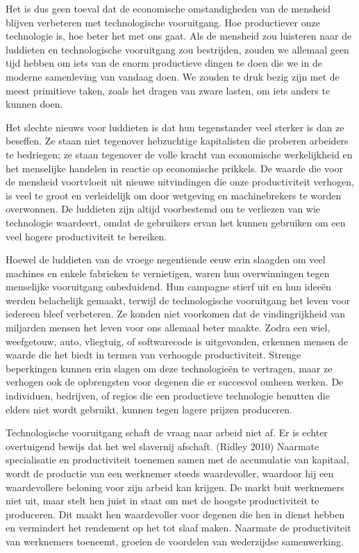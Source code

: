 \documentclass[
  a5paper,
  smalldemyvopaper,11pt,twoside,onecolumn,openright,extrafontsizes,
hidelinks]{memoir}
\begin{document}
Het is dus geen toeval dat de economische omstandigheden van de mensheid
blijven verbeteren met technologische vooruitgang. Hoe productiever onze
technologie is, hoe beter het met ons gaat. Als de mensheid zou
luisteren naar de luddieten en technologische vooruitgang zou
bestrijden, zouden we allemaal geen tijd hebben om iets van de enorm
productieve dingen te doen die we in de moderne samenleving van vandaag
doen. We zouden te druk bezig zijn met de meest primitieve taken, zoals
het dragen van zware lasten, om iets anders te kunnen doen.

Het slechte nieuws voor luddieten is dat hun tegenstander veel sterker
is dan ze beseffen. Ze staan niet tegenover hebzuchtige kapitalisten die
proberen arbeiders te bedriegen; ze staan tegenover de volle kracht van
economische werkelijkheid en het menselijke handelen in reactie op
economische prikkels. De waarde die voor de mensheid voortvloeit uit
nieuwe uitvindingen die onze productiviteit verhogen, is veel te groot
en verleidelijk om door wetgeving en machinebrekers te worden
overwonnen. De luddieten zijn altijd voorbestemd om te verliezen van wie
technologie waardeert, omdat de gebruikers ervan het kunnen gebruiken om
een veel hogere productiviteit te bereiken.

Hoewel de luddieten van de vroege negentiende eeuw erin slaagden om veel
machines en enkele fabrieken te vernietigen, waren hun overwinningen
tegen menselijke vooruitgang onbeduidend. Hun campagne stierf uit en hun
ideeën werden belachelijk gemaakt, terwijl de technologische vooruitgang
het leven voor iedereen bleef verbeteren. Ze konden niet voorkomen dat
de vindingrijkheid van miljarden mensen het leven voor ons allemaal
beter maakte. Zodra een wiel, weefgetouw, auto, vliegtuig, of
softwarecode is uitgevonden, erkennen mensen de waarde die het biedt in
termen van verhoogde productiviteit. Strenge beperkingen kunnen erin
slagen om deze technologieën te vertragen, maar ze verhogen ook de
opbrengsten voor degenen die er succesvol omheen werken. De individuen,
bedrijven, of regios die een productieve technologie benutten die elders
niet wordt gebruikt, kunnen tegen lagere prijzen produceren.

Technologische vooruitgang schaft de vraag naar arbeid niet af. Er is
echter overtuigend bewijs dat het wel slavernij afschaft. (Ridley 2010)
Naarmate specialisatie en productiviteit toenemen samen met de
accumulatie van kapitaal, wordt de productie van een werknemer steeds
waardevoller, waardoor hij een waardevollere beloning voor zijn arbeid
kan krijgen. De markt buit werknemers niet uit, maar stelt hen juist in
staat om met de hoogste productiviteit te produceren. Dit maakt hen
waardevoller voor degenen die hen in dienst hebben en vermindert het
rendement op het tot slaaf maken. Naarmate de productiviteit van
werknemers toeneemt, groeien de voordelen van wederzijdse samenwerking.
\end{document}
